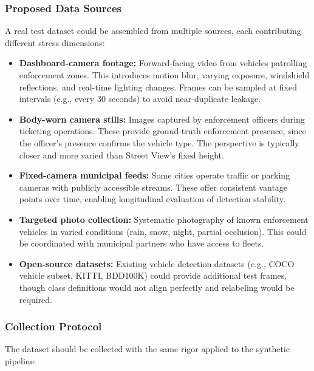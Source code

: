 \documentclass[12pt,a4paper]{article}
\begin{document}
\subsubsection{Proposed Data Sources}

A real test dataset could be assembled from multiple sources, each contributing different stress dimensions:

\begin{itemize}
	\item \textbf{Dashboard-camera footage:} Forward-facing video from vehicles patrolling enforcement zones. This introduces motion blur, varying exposure, windshield reflections, and real-time lighting changes. Frames can be sampled at fixed intervals (e.g., every 30 seconds) to avoid near-duplicate leakage.

	\item \textbf{Body-worn camera stills:} Images captured by enforcement officers during ticketing operations. These provide ground-truth enforcement presence, since the officer's presence confirms the vehicle type. The perspective is typically closer and more varied than Street View's fixed height.

	\item \textbf{Fixed-camera municipal feeds:} Some cities operate traffic or parking cameras with publicly accessible streams. These offer consistent vantage points over time, enabling longitudinal evaluation of detection stability.

	\item \textbf{Targeted photo collection:} Systematic photography of known enforcement vehicles in varied conditions (rain, snow, night, partial occlusion). This could be coordinated with municipal partners who have access to fleets.

	\item \textbf{Open-source datasets:} Existing vehicle detection datasets (e.g., COCO vehicle subset, KITTI, BDD100K) could provide additional test frames, though class definitions would not align perfectly and relabeling would be required.
\end{itemize}

\subsubsection{Collection Protocol}

The dataset should be collected with the same rigor applied to the synthetic pipeline:
\end{document}
